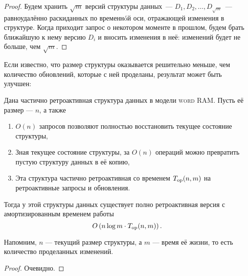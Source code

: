 \begin{proof}
	Будем хранить $\sqrt{m}$ версий структуры данных~— $D_1, D_2, \ldots, D_{\sqrt{m}}$~— равноудалённо раскиданных по временн\'oй оси, отражающей изменения в структуре. Когда приходит запрос о некотором моменте в прошлом, будем брать ближайшую к нему версию $D_i$ и вносить изменения в неё: изменений будет не больше, чем $\sqrt{m}$.
\end{proof}

Если известно, что размер структуры оказывается решительно меньше, чем количество обновлений, которые с ней проделаны, результат может быть улучшен:

\begin{theorem}
	Дана частично ретроактивная структура данных в модели {\scshape word RAM}. Пусть её размер — $n$, а также
     \begin{enumerate}
	\item $O(n)$ запросов позволяют полностью восстановить текущее состояние структуры,
	\item Зная текущее состояние структуры, за $O(n)$ операций можно превратить пустую структуру данных в её копию,
	\item Эта структура частично ретроактивная со временем $T_{\mathrm{op}} (n,m)$ на ретроактивные запросы и обновления.
     \end{enumerate}

	Тогда у этой структуры данных существует полно ретроактивная версия с амортизированным временем работы
     \begin{equation*}
	O \left( n \log m \cdot T_{\mathrm{op}} (n,m) \right).
     \end{equation*}

	Напомним, $n$ — текущий размер структуры, а $m$ — время её жизни, то есть количество проделанных изменений.
\end{theorem}

\begin{proof}
	Очевидно.
\end{proof}
